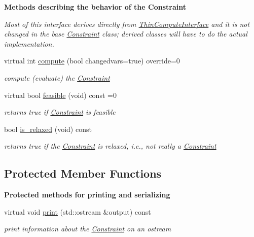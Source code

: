 \begin{Indent}\textbf{ Methods describing the behavior of the Constraint}\par
{\em Most of this interface derives directly from \mbox{\hyperlink{class_s_m_spp__di__unipi__it_1_1_thin_compute_interface}{Thin\+Compute\+Interface}} and it is not changed in the base \mbox{\hyperlink{class_s_m_spp__di__unipi__it_1_1_constraint}{Constraint}} class; derived classes will have to do the actual implementation. }\begin{DoxyCompactItemize}
\item 
virtual int \mbox{\hyperlink{class_s_m_spp__di__unipi__it_1_1_constraint_a504d4e3e174c7a518cc66156a8a45ce5}{compute}} (bool changedvars=true) override=0
\begin{DoxyCompactList}\small\item\em compute (evaluate) the \mbox{\hyperlink{class_s_m_spp__di__unipi__it_1_1_constraint}{Constraint}} \end{DoxyCompactList}\item 
virtual bool \mbox{\hyperlink{class_s_m_spp__di__unipi__it_1_1_constraint_a29e571bbd4e2f1046c56e39c06633c4c}{feasible}} (void) const =0
\begin{DoxyCompactList}\small\item\em returns true if \mbox{\hyperlink{class_s_m_spp__di__unipi__it_1_1_constraint}{Constraint}} is feasible \end{DoxyCompactList}\item 
\mbox{\label{class_s_m_spp__di__unipi__it_1_1_constraint_a1a65568cbfeada174c656ab07d355caa}} 
bool \mbox{\hyperlink{class_s_m_spp__di__unipi__it_1_1_constraint_a1a65568cbfeada174c656ab07d355caa}{is\+\_\+relaxed}} (void) const
\begin{DoxyCompactList}\small\item\em returns true if the \mbox{\hyperlink{class_s_m_spp__di__unipi__it_1_1_constraint}{Constraint}} is relaxed, i.\+e., not really a \mbox{\hyperlink{class_s_m_spp__di__unipi__it_1_1_constraint}{Constraint}} \end{DoxyCompactList}\end{DoxyCompactItemize}
\end{Indent}
\subsection*{Protected Member Functions}
\begin{Indent}\textbf{ Protected methods for printing and serializing}\par
\begin{DoxyCompactItemize}
\item 
virtual void \mbox{\hyperlink{class_s_m_spp__di__unipi__it_1_1_constraint_a2e7b9c9148a98c5c342e8c25cac95926}{print}} (std\+::ostream \&output) const
\begin{DoxyCompactList}\small\item\em print information about the \mbox{\hyperlink{class_s_m_spp__di__unipi__it_1_1_constraint}{Constraint}} on an ostream \end{DoxyCompactList}\end{DoxyCompactItemize}
\end{Indent}
